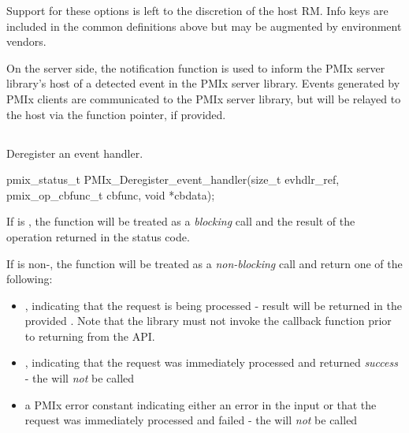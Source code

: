 Support for these options is left to the discretion of the host \ac{RM}. Info keys are included in the common definitions above but may be augmented by environment vendors.
\adviceuserend

\advicermstart
On the server side, the notification function is used to inform the \ac{PMIx} server library's host of a detected event in the \ac{PMIx} server library. Events generated by \ac{PMIx} clients are communicated to the \ac{PMIx} server library, but will be relayed to the host via the  function pointer, if provided.
\advicermend



\subsection{}

\summary

Deregister an event handler.

\format

\cspecificstart
\begin{codepar}
pmix_status_t
PMIx_Deregister_event_handler(size_t evhdlr_ref,
                              pmix_op_cbfunc_t cbfunc,
                              void *cbdata);
\end{codepar}
\cspecificend

\begin{arglist}
\end{arglist}

If  is , the function will be treated as a \emph{blocking} call and the result of the operation returned in the status code.

If  is non-, the function will be treated as a \emph{non-blocking} call and return one of the following:

\begin{itemize}
\item {}, indicating that the request is being processed - result will be returned in the provided . Note that the library must not invoke the callback function prior to returning from the \ac{API}.
\item {}, indicating that the request was immediately processed and returned \textit{success} - the  will \textit{not} be called
\item a PMIx error constant indicating either an error in the input or that the request was immediately processed and failed - the  will \textit{not} be called
\end{itemize}

